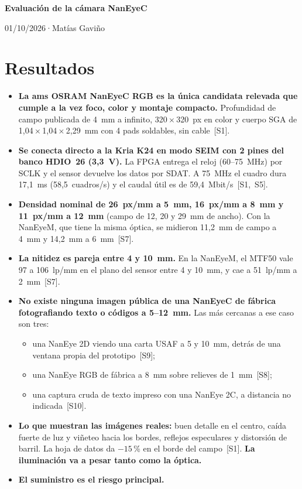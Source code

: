 \documentclass[11pt,a4paper]{article}
\newcommand{\titulo}{Evaluación de la cámara NanEyeC}
\newcommand{\autor}{Matías Gaviño}
\newcommand{\fecha}{01/10/2026}                    %
\newcommand{\cabecera}{%
  \thispagestyle{fancy}%
  {\fontsize{20}{24}\selectfont\bfseries\titulo\par}%
  \vspace{5pt}%
  {\small\color{gris-medio}\fecha\quad·\quad\autor\par}%
  \vspace{6pt}}
\begin{document}
\cabecera

\section{Resultados}

\begin{itemize}
  \item \textbf{La ams OSRAM NanEyeC RGB es la única candidata relevada que cumple a la vez foco, color y montaje compacto.}
  Profundidad de campo publicada de 4~mm a infinito, 320\,$\times$\,320~px en color y cuerpo SGA de 1,04\,$\times$\,1,04\,$\times$\,2,29~mm con 4 pads soldables, sin cable~[S1].
  \item \textbf{Se conecta directo a la Kria K24 en modo SEIM con 2 pines del banco HDIO~26 (3,3~V).}
  La FPGA entrega el reloj (60--75~MHz) por SCLK y el sensor devuelve los datos por SDAT. A 75~MHz el cuadro dura 17,1~ms (58,5~cuadros/s) y el caudal útil es de 59,4~Mbit/s~[S1,~S5].
  \item \textbf{Densidad nominal de 26~px/mm a 5~mm, 16~px/mm a 8~mm y 11~px/mm a 12~mm} (campo de 12, 20 y 29~mm de ancho).
  Con la NanEyeM, que tiene la misma óptica, se midieron 11,2~mm de campo a 4~mm y 14,2~mm a 6~mm~[S7].
  \item \textbf{La nitidez es pareja entre 4 y 10~mm.}
  En la NanEyeM, el MTF50 vale 97 a 106~lp/mm en el plano del sensor entre 4 y 10~mm, y cae a 51~lp/mm a 2~mm~[S7].
  \item \textbf{No existe ninguna imagen pública de una NanEyeC de fábrica fotografiando texto o códigos a 5--12~mm.}
  Las más cercanas a ese caso son tres:
  \begin{itemize}
    \item una NanEye 2D viendo una carta USAF a 5 y 10~mm, detrás de una ventana propia del prototipo~[S9];
    \item una NanEye RGB de fábrica a 8~mm sobre relieves de 1~mm~[S8];
    \item una captura cruda de texto impreso con una NanEye 2C, a distancia no indicada~[S10].
  \end{itemize}
  \item \textbf{Lo que muestran las imágenes reales:} buen detalle en el centro, caída fuerte de luz y viñeteo hacia los bordes, reflejos especulares y distorsión de barril. La hoja de datos da $-15$\,\% en el borde del campo~[S1]. \textbf{La iluminación va a pesar tanto como la óptica.}
  \item \textbf{El suministro es el riesgo principal.}

\end{itemize}
\end{document}

